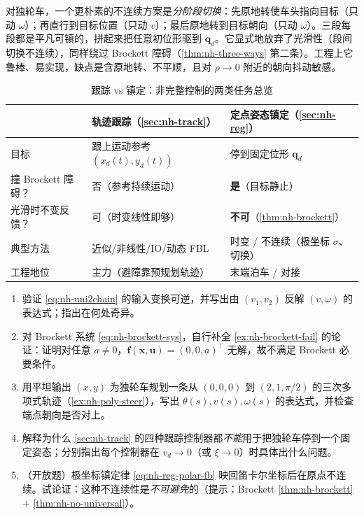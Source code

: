 \begin{example}\label{ex:nh-switch}
对独轮车，一个更朴素的不连续方案是\emph{分阶段切换}：先原地转使车头指向目标（只动 $\omega$）；再直行到目标位置（只动 $v$）；最后原地转到目标朝向（只动 $\omega$）。三段每段都是平凡可镇的，拼起来把任意初位形驱到 $\mathbf{q}_d$。它显式地放弃了光滑性（段间切换不连续），同样绕过 Brockett 障碍（\cref{thm:nh-three-ways} 第二条）。工程上它鲁棒、易实现，缺点是含原地转、不平顺，且对 $\rho\to0$ 附近的朝向抖动敏感。
\end{example}

\begin{table}[H]\centering\small
\caption{跟踪 vs 镇定：非完整控制的两类任务总览}
\label{tab:nh-track-vs-reg}
\begin{tabular}{lll}
\toprule
 & 轨迹跟踪（\cref{sec:nh-track}） & 定点姿态镇定（\cref{sec:nh-reg}） \\
\midrule
目标 & 跟上运动参考 $(x_d(t),y_d(t))$ & 停到固定位形 $\mathbf{q}_d$ \\
撞 Brockett 障碍？ & 否（参考持续运动） & \textbf{是}（目标静止） \\
光滑时不变反馈？ & 可（时变线性即够） & \textbf{不可}（\cref{thm:nh-brockett}） \\
典型方法 & 近似/非线性/IO/动态 FBL & 时变 / 不连续（极坐标 $\sigma$、切换） \\
工程地位 & 主力（避障靠预规划轨迹） & 末端泊车 / 对接 \\
\bottomrule
\end{tabular}
\end{table}

\begin{practice}
\begin{enumerate}
  \item 验证 \cref{eq:nh-uni2chain} 的输入变换可逆，并写出由 $(v_1,v_2)$ 反解 $(v,\omega)$ 的表达式；指出在何处奇异。
  \item 对 Brockett 系统 \cref{eq:nh-brockett-sys}，自行补全 \cref{ex:nh-brockett-fail} 的论证：证明对任意 $a\neq0$，$\mathbf{f}(\mathbf{x},\mathbf{u})=(0,0,a)^\top$ 无解，故不满足 Brockett 必要条件。
  \item 用平坦输出 $(x,y)$ 为独轮车规划一条从 $(0,0,0)$ 到 $(2,1,\pi/2)$ 的三次多项式轨迹（\cref{ex:nh-poly-steer}），写出 $\theta(s),v(s),\omega(s)$ 的表达式，并检查端点朝向是否对上。
  \item 解释为什么 \cref{sec:nh-track} 的四种跟踪控制器都\emph{不能}用于把独轮车停到一个固定姿态；分别指出每个控制器在 $v_d\to0$（或 $\xi\to0$）时具体出什么问题。
  \item （开放题）极坐标镇定律 \cref{eq:nh-reg-polar-fb} 映回笛卡尔坐标后在原点不连续。试论证：这种不连续性是\emph{不可避免}的（提示：Brockett \cref{thm:nh-brockett} $+$ \cref{thm:nh-no-universal}）。
\end{enumerate}
\end{practice}

